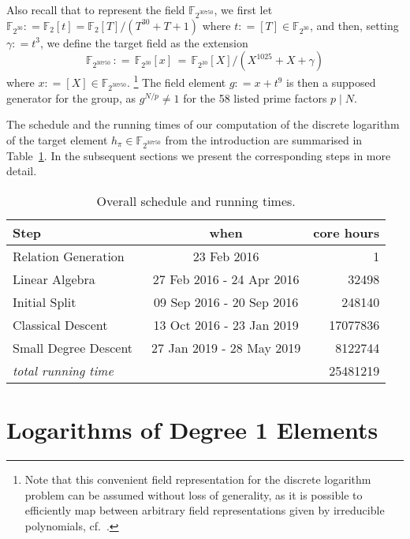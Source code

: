 \documentclass[11pt]{llncs}
\newcommand{\F}{\mathbb F}
\newcommand{\defeq}{\mathrel{\mathop:}=}
\begin{document}
Also recall that to represent the field $\F_{2^{30750}}$, we first let
$\F_{2^{30}} \defeq \F_2[t] = \F_2[T] / (T^{30} + T + 1)$ where
$t \defeq [T] \in \F_{2^{30}}$, and then, setting $\gamma \defeq t^3$,
we define the target field as the extension \[ \F_{2^{30750}} \,\defeq\,
  \F_{2^{30}}[x] \,=\, \F_{2^{30}}[X] / (X^{1025} + X + \gamma) \]
where $x \defeq [X] \in \F_{2^{30750}}$.%
\footnote{Note that this convenient field representation for the
  discrete logarithm problem can be assumed without loss of
  generality, as it is possible to efficiently map between arbitrary
  field representations given by irreducible polynomials,
  cf.~\cite{Lenstra1991}.}
The field element $g \defeq x + t^9$ is then a supposed generator
for the group, as $g^{N / p} \ne 1$ for the 58 listed prime factors
$p \mid N$.

The schedule and the running times of our computation of the discrete
logarithm of the target element $h_{\pi} \in \F_{2^{30750}}$ from the
introduction are summarised in Table~\ref{tab:rt}.  In the subsequent
sections we present the corresponding steps in more detail.

\begin{table}
  \begin{center}
    \caption{Overall schedule and running times.} \label{tab:rt}
    \begin{tabular}{lcr}
      Step & when & core hours \\\hline
      Relation Generation & 23 Feb 2016 & 1 \\
      Linear Algebra & 27 Feb 2016 - 24 Apr 2016 & \num{32498} \\
      Initial Split & 09 Sep 2016 - 20 Sep 2016 & \num{248140} \\
      Classical Descent & 13 Oct 2016 - 23 Jan 2019 & ~\num{17077836} \\
      Small Degree Descent~ & 27 Jan 2019 - 28 May 2019 & \num{8122744} \\\hline
      \emph{total running time} & & \num{25481219}
    \end{tabular}
  \end{center}
\end{table}


\section{Logarithms of Degree 1 Elements}\label{sec:degree1}
\end{document}
